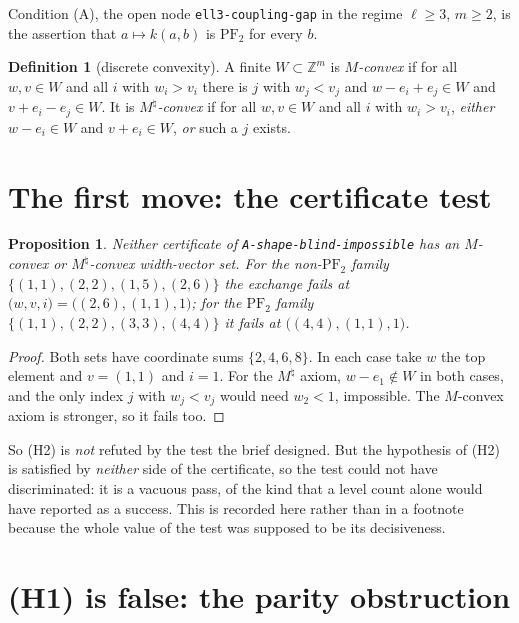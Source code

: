\documentclass[11pt]{article}
\theoremstyle{plain}
\newtheorem{proposition}[theorem]{Proposition}
\theoremstyle{definition}
\newtheorem{definition}[theorem]{Definition}
\newcommand{\PFtwo}{\mathrm{PF}_2}
\newcommand{\Z}{\mathbb{Z}}
\begin{document}
Condition (A), the open node \texttt{ell3-coupling-gap} in the regime $\ell\ge3$,
$m\ge2$, is the assertion that $a\mapsto k(a,b)$ is $\PFtwo$ for every $b$.

\begin{definition}[discrete convexity]\label{def:Mconv}
A finite $W\subset\Z^m$ is \emph{$M$-convex} if for all $w,v\in W$ and all $i$ with
$w_i>v_i$ there is $j$ with $w_j<v_j$ and $w-e_i+e_j\in W$ and $v+e_i-e_j\in W$.
It is \emph{$M^\natural$-convex} if for all $w,v\in W$ and all $i$ with $w_i>v_i$,
\emph{either} $w-e_i\in W$ and $v+e_i\in W$, \emph{or} such a $j$ exists.
\end{definition}

\section{The first move: the certificate test}\label{sec:firstmove}

\begin{proposition}\label{prop:firstmove}
Neither certificate of \texttt{A-shape-blind-impossible} has an $M$-convex or
$M^\natural$-convex width-vector set. For the non-$\PFtwo$ family
$\{(1,1),(2,2),(1,5),(2,6)\}$ the exchange fails at $\bigl(w,v,i\bigr)=\bigl((2,6),(1,1),1\bigr)$;
for the $\PFtwo$ family $\{(1,1),(2,2),(3,3),(4,4)\}$ it fails at $\bigl((4,4),(1,1),1\bigr)$.
\end{proposition}

\begin{proof}
Both sets have coordinate sums $\{2,4,6,8\}$. In each case take $w$ the top element and
$v=(1,1)$ and $i=1$. For the $M^\natural$ axiom, $w-e_1\notin W$ in both cases, and the
only index $j$ with $w_j<v_j$ would need $w_2<1$, impossible. The $M$-convex axiom is
stronger, so it fails too.
\end{proof}

So (H2) is \emph{not} refuted by the test the brief designed. But the hypothesis of (H2)
is satisfied by \emph{neither} side of the certificate, so the test could not have
discriminated: it is a vacuous pass, of the kind that a level count alone would have
reported as a success. This is recorded here rather than in a footnote because the whole
value of the test was supposed to be its decisiveness.

\section{(H1) is false: the parity obstruction}\label{sec:refute}
\end{document}
